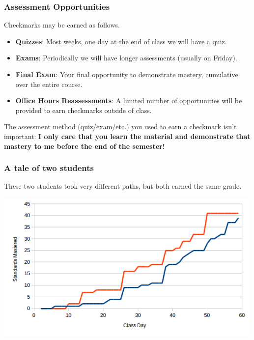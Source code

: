 \documentclass[aspectration=1610]{beamer}
\begin{document}
\begin{frame}\frametitle{Assessment Opportunities}
Checkmarks may be earned as follows.
\begin{itemize}
\item {\bf Quizzes}: Most weeks, one day at the end of class we will have a quiz. 
\item {\bf Exams}: Periodically we will have longer assessments (usually on Friday).
\item {\bf Final Exam}: Your final opportunity to demonstrate mastery,
      cumulative over the entire course.
\item {\bf Office Hours Reassessments}: A limited number of opportunities
      will be provided to earn checkmarks outside of class.
\end{itemize}

\pause

\vspace{0.2in}

The assessment method (quiz/exam/etc.) you used to earn a checkmark
isn't important: \textbf{I only care that you
learn the material and demonstrate that mastery to me before the end of the
semester!}
\end{frame}

\begin{frame}\frametitle{A tale of two students}
These two students took very different paths, but both earned the same grade.
\begin{center}
\includegraphics[scale=0.7]{student-comparison.png}
\end{center}
\end{frame}
\end{document}
